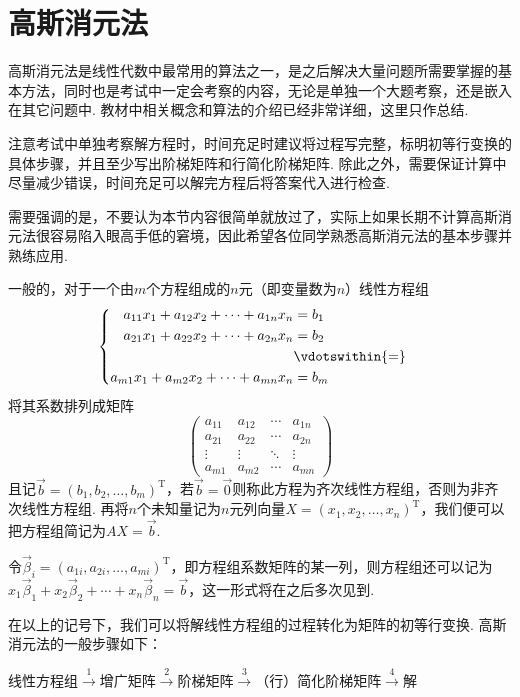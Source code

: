 \section{高斯消元法}

高斯消元法是线性代数中最常用的算法之一，是之后解决大量问题所需要掌握的基本方法，同时也是考试中一定会考察的内容，无论是单独一个大题考察，还是嵌入在其它问题中. 教材中相关概念和算法的介绍已经非常详细，这里只作总结.

注意考试中单独考察解方程时，时间充足时建议将过程写完整，标明初等行变换的具体步骤，并且至少写出阶梯矩阵和行简化阶梯矩阵. 除此之外，需要保证计算中尽量减少错误，时间充足可以解完方程后将答案代入进行检查.

需要强调的是，不要认为本节内容很简单就放过了，实际上如果长期不计算高斯消元法很容易陷入眼高手低的窘境，因此希望各位同学熟悉高斯消元法的基本步骤并熟练应用.

一般的，对于一个由$m$个方程组成的$n$元（即变量数为$n$）线性方程组
\[ \begin{cases} \begin{aligned}
            a_{11}x_1+a_{12}x_2+\cdots+a_{1n}x_n & = b_1           \\
            a_{21}x_1+a_{22}x_2+\cdots+a_{2n}x_n & = b_2           \\
                                                 & \vdotswithin{=} \\
            a_{m1}x_1+a_{m2}x_2+\cdots+a_{mn}x_n & = b_m
        \end{aligned} \end{cases} \]
将其系数排列成矩阵
\[\begin{pmatrix}
        a_{11} & a_{12} & \cdots & a_{1n} \\
        a_{21} & a_{22} & \cdots & a_{2n} \\
        \vdots & \vdots & \ddots & \vdots \\
        a_{m1} & a_{m2} & \cdots & a_{mn}
    \end{pmatrix}\]
且记$\vec{b}=(b_1,b_2,\ldots,b_m)^\mathrm{T}$，若$\vec{b}=\vec{0}$则称此方程为齐次线性方程组，否则为非齐次线性方程组. 再将$n$个未知量记为$n$元列向量$X=(x_1,x_2,\ldots,x_n)^\mathrm{T}$，我们便可以把方程组简记为$AX=\vec{b}$.

令$\vec{\beta}_i=(a_{1i},a_{2i},\ldots,a_{mi})^\mathrm{T}$，即方程组系数矩阵的某一列，则方程组还可以记为$x_1\vec{\beta}_1+x_2\vec{\beta}_2+\cdots+x_n\vec{\beta}_n=\vec{b}$，这一形式将在之后多次见到.

在以上的记号下，我们可以将解线性方程组的过程转化为矩阵的初等行变换. 高斯消元法的一般步骤如下：
\begin{center}
    线性方程组$\overset{1}{\longrightarrow}$增广矩阵$\overset{2}{\longrightarrow}$阶梯矩阵$\overset{3}{\longrightarrow}$（行）简化阶梯矩阵$\overset{4}{\longrightarrow}$解
\end{center}


